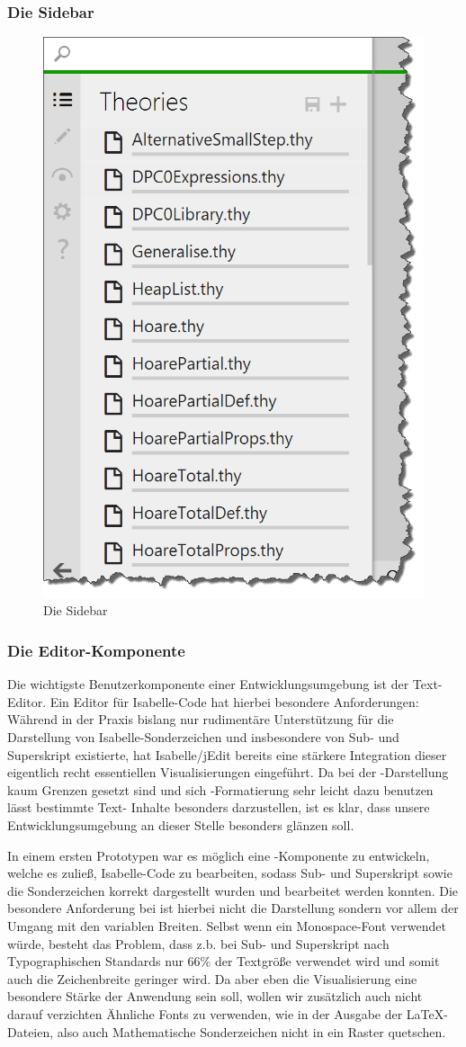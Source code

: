 \subsubsection{Die Sidebar}

\begin{figure}[ht]
\includegraphics[width=0.4\linewidth]{images/screen-sidebar}
  \caption{Die Sidebar}
  \label{fig:screen-sidebar}
\end{figure}

\subsubsection{Die Editor-Komponente}

Die wichtigste Benutzerkomponente einer Entwicklungsumgebung ist der Text-Editor. Ein Editor für
Isabelle-Code hat hierbei besondere Anforderungen: Während in der Praxis bislang nur rudimentäre
Unterstützung für die Darstellung von Isabelle-Sonderzeichen und insbesondere von Sub- und
Superskript existierte, hat Isabelle/jEdit bereits eine stärkere Integration dieser eigentlich recht
essentiellen Visualisierungen eingeführt. \cite{iscala} Da bei der -Darstellung kaum
Grenzen gesetzt sind und sich -Formatierung sehr leicht dazu benutzen lässt bestimmte Text-
Inhalte besonders darzustellen, ist es klar, dass unsere Entwicklungsumgebung an dieser Stelle
besonders glänzen soll.

In einem ersten Prototypen war es möglich eine -Komponente zu entwickeln, welche es zuließ,
Isabelle-Code zu bearbeiten, sodass Sub- und Superskript sowie die Sonderzeichen korrekt dargestellt
wurden und bearbeitet werden konnten. Die besondere Anforderung bei ist hierbei nicht die
Darstellung sondern vor allem der Umgang mit den variablen Breiten. Selbst wenn ein Monospace-Font
verwendet würde, besteht das Problem, dass z.b. bei Sub- und Superskript nach Typographischen
Standards nur 66\% der Textgröße verwendet wird und somit auch die Zeichenbreite geringer wird. Da
aber eben die Visualisierung eine besondere Stärke der Anwendung sein soll, wollen wir zusätzlich
auch nicht darauf verzichten Ähnliche Fonts zu verwenden, wie in der Ausgabe der LaTeX-Dateien, also
auch Mathematische Sonderzeichen nicht in ein Raster quetschen. 

